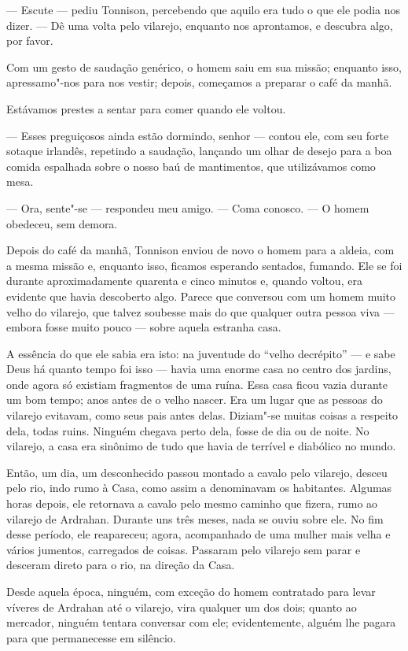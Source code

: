 --- Escute --- pediu Tonnison, percebendo que aquilo era tudo o que ele podia nos dizer. --- Dê uma volta pelo vilarejo,
enquanto nos aprontamos, e descubra algo, por favor.

Com um gesto de saudação genérico, o homem saiu em sua missão; enquanto isso, apressamo"-nos para nos vestir; depois,
começamos a preparar o café da manhã.

Estávamos prestes a sentar para comer quando ele voltou.

--- Esses preguiçosos ainda estão dormindo, senhor --- contou ele, com seu forte sotaque irlandês, repetindo a saudação,
lançando um olhar de desejo para a boa comida espalhada sobre o nosso baú de mantimentos, que utilizávamos como mesa.

--- Ora, sente"-se --- respondeu meu amigo. --- Coma conosco. --- O homem obedeceu, sem demora.

Depois do café da manhã, Tonnison enviou de novo o homem para a aldeia, com a mesma missão e, enquanto isso, ficamos
esperando sentados, fumando. Ele se foi durante aproximadamente quarenta e cinco minutos e, quando voltou, era evidente
que havia descoberto algo. Parece que conversou com um homem muito velho do vilarejo, que talvez soubesse mais
do que qualquer outra pessoa viva --- embora fosse muito pouco --- sobre aquela estranha casa.

A essência do que ele sabia era isto: na juventude do “velho decrépito” --- e sabe Deus há quanto tempo foi isso --- havia
uma enorme casa no centro dos jardins, onde agora só existiam fragmentos de uma ruína. Essa casa ficou vazia durante um
bom tempo; anos antes de o velho nascer. Era um lugar que as pessoas do vilarejo evitavam, como seus pais antes delas.
Diziam"-se muitas coisas a respeito dela, todas ruins. Ninguém chegava perto dela, fosse de dia ou de noite. No
vilarejo, a casa era sinônimo de tudo que havia de terrível e diabólico no mundo.

Então, um dia, um desconhecido passou montado a cavalo pelo vilarejo, desceu pelo rio, indo rumo à Casa, como
assim a denominavam os habitantes. Algumas horas depois, ele retornava a cavalo pelo mesmo caminho que fizera, rumo ao
vilarejo de Ardrahan. Durante uns três meses, nada se ouviu sobre ele. No fim desse período, ele reapareceu;
agora, acompanhado de uma mulher mais velha e vários jumentos, carregados de coisas. Passaram pelo vilarejo sem parar e
desceram direto para o rio, na direção da Casa.

Desde aquela época, ninguém, com exceção do homem contratado para levar víveres de Ardrahan até o vilarejo, vira
qualquer um dos dois; quanto ao mercador, ninguém tentara conversar com ele; evidentemente, alguém lhe pagara para que
permanecesse em silêncio.

